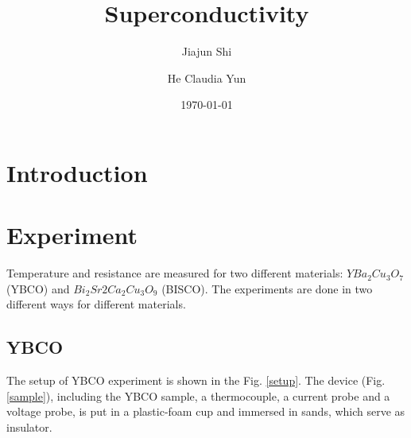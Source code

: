 \documentclass[prb,preprint]{revtex4-1}
\begin{document}
\title{Superconductivity}

\author{Jiajun Shi}
\author{He Claudia Yun}


\date{\today}


\begin{abstract}

\end{abstract}

\maketitle 

\section{Introduction}

\section{Experiment}
Temperature and resistance are measured for two different materials: $YBa_{2}Cu_{3}O_{7}$ (YBCO) and $Bi_{2}Sr{2}Ca_{2}Cu_{3}O_{9}$ (BISCO). The experiments are done in two different ways for different materials.\\
\subsection{YBCO}
The setup of YBCO experiment is shown in the Fig. \ref{setup}. The device (Fig. \ref{sample}), including the YBCO sample, a thermocouple, a current probe and a voltage probe, is put in a plastic-foam cup and immersed in sands, which serve as insulator. \\
\end{document}

